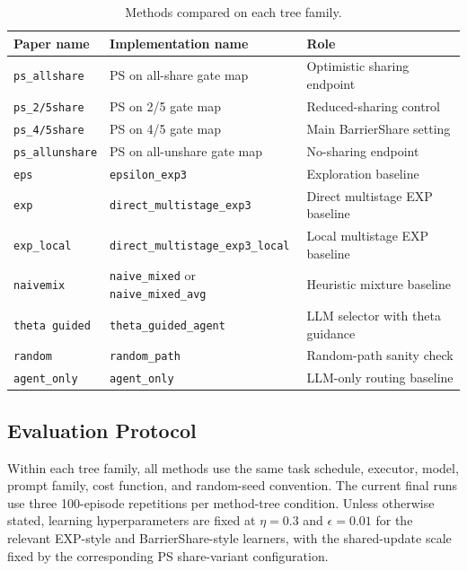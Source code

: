 \begin{table}[t]
    \centering
    \small
    \caption{Methods compared on each tree family.}
    \label{tab:methods}
    \begin{tabular}{lll}
        \toprule
        Paper name & Implementation name & Role \\
        \midrule
        \texttt{ps\_allshare} & PS on all-share gate map & Optimistic sharing endpoint \\
        \texttt{ps\_2/5share} & PS on 2/5 gate map & Reduced-sharing control \\
        \texttt{ps\_4/5share} & PS on 4/5 gate map & Main BarrierShare setting \\
        \texttt{ps\_allunshare} & PS on all-unshare gate map & No-sharing endpoint \\
        \texttt{eps} & \texttt{epsilon\_exp3} & Exploration baseline \\
        \texttt{exp} & \texttt{direct\_multistage\_exp3} & Direct multistage EXP baseline \\
        \texttt{exp\_local} & \texttt{direct\_multistage\_exp3\_local} & Local multistage EXP baseline \\
        \texttt{naivemix} & \texttt{naive\_mixed} or \texttt{naive\_mixed\_avg} & Heuristic mixture baseline \\
        \texttt{theta guided} & \texttt{theta\_guided\_agent} & LLM selector with theta guidance \\
        \texttt{random} & \texttt{random\_path} & Random-path sanity check \\
        \texttt{agent\_only} & \texttt{agent\_only} & LLM-only routing baseline \\
        \bottomrule
    \end{tabular}
\end{table}

\subsection{Evaluation Protocol}
\label{sec:exp_protocol}

Within each tree family, all methods use the same task schedule, executor, model, prompt family, cost function, and random-seed convention. The current final runs use three 100-episode repetitions per method-tree condition. Unless otherwise stated, learning hyperparameters are fixed at $\eta=0.3$ and $\epsilon=0.01$ for the relevant EXP-style and BarrierShare-style learners, with the shared-update scale fixed by the corresponding PS share-variant configuration.


